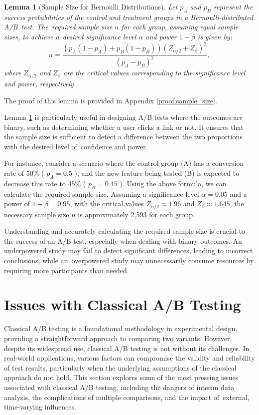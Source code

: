 \documentclass[magisterska, english]{pwr_wmat_praca_dyplomowa}
\theoremstyle{plain}
\numberwithin{theorem}{chapter}
\newtheorem{lemma}[theorem]{Lemma}
\theoremstyle{definition}
\numberwithin{theorem}{chapter}
\begin{document}
\begin{lemma}[Sample Size for Bernoulli Distributions]\label{lem:sample_size}
	Let \( p_A \) and \( p_B \) represent the success probabilities of the control and treatment groups in a Bernoulli-distributed A/B~test. The~required sample size \( n \) for each group, assuming equal sample sizes, to achieve a~desired significance level \( \alpha \) and power \( 1-\beta \) is given by:
	\begin{equation}
		n = \frac{(p_A(1-p_A)+ p_B(1-p_B))(Z_{\alpha/2} + Z_\beta)^2}{(p_A - p_B)^2},
	\end{equation}
	where \( Z_{\alpha/2} \) and \( Z_\beta \) are the critical values corresponding to the significance level and power, respectively.
\end{lemma}
\noindent The proof of this lemma is provided in Appendix \ref{proof:sample_size}.

Lemma \ref{lem:sample_size} is particularly useful in designing A/B tests where the outcomes are binary, such as determining whether a user clicks a link or not. It ensures that the sample size is sufficient to detect a difference between the two proportions with the desired level of~confidence and power.

For instance, consider a scenario where the control group (A) has a conversion rate of 50\% ( \( p_A = 0.5 \) ), and the new feature being tested (B) is expected to decrease this rate to 45\% ( \( p_B = 0.45 \) ). Using the above formula, we can calculate the required sample size. Assuming a significance level \( \alpha = 0.05 \) and a power of \( 1-\beta = 0.95 \), with the critical values \( Z_{\alpha/2} \approx 1.96 \) and \( Z_\beta \approx 1.645 \), the necessary sample size \( n \) is approximately 2,593 for each group.

Understanding and accurately calculating the required sample size is crucial to the success of an A/B test, especially when dealing with binary outcomes. An underpowered study may fail to detect significant differences, leading to incorrect conclusions, while an~overpowered study may unnecessarily consume resources by requiring more participants than needed.

\section{Issues with Classical A/B Testing}

Classical A/B testing is a foundational methodology in experimental design, providing a straightforward approach to comparing two variants. However, despite its widespread use, classical A/B testing is not without its challenges. In real-world applications, various factors can compromise the validity and reliability of test results, particularly when the underlying assumptions of the classical approach do not hold. This section explores some of the most pressing issues associated with classical A/B testing, including the dangers of interim data analysis, the complications of multiple comparisons, and the impact of~external, time-varying influences.
\end{document}
